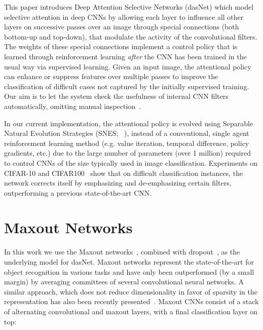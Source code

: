 This paper introduces Deep Attention Selective Networks (dasNet) which
model selective attention in deep CNNs by allowing each layer to
influence all other layers on successive passes over an image through
special connections (both bottom-up and top-down), that modulate the
activity of the convolutional filters.  The weights of these special
connections implement a control policy that is learned through
reinforcement learning {\em after} the CNN has been trained in the
usual way via supervised learning. Given an input image, the
attentional policy can enhance or suppress 
features over multiple passes to improve the classification of
difficult cases not captured by the initially supervised training.
Our aim is to let the system check the usefulness of internal CNN filters 
automatically, omitting manual inspection~\cite{zeiler2013}.

In our current implementation, the attentional policy is evolved using
Separable Natural Evolution Strategies (SNES; ~\cite{schaul2011high}),
instead of a conventional, single agent reinforcement learning method
(e.g. value iteration, temporal difference, policy gradients, etc.)
due to the large number of parameters (over 1 million)
required to control CNNs of the size typically used in image
classification.  Experiments on
CIFAR-10 and CIFAR100~\cite{krizhevsky:2009} %
show that on difficult classification instances, the network corrects
itself by emphasizing and de-emphasizing certain filters,
outperforming a previous state-of-the-art CNN.

\section{Maxout Networks}
\label{sec:maxout}
In this work we use the Maxout networks~\cite{goodfellow2013maxout},
combined with dropout~\cite{hinton2012improving}, as the underlying
model for dasNet. Maxout networks represent the state-of-the-art for
object recognition in various tasks and have only been outperformed
(by a small margin) by averaging committees of several convolutional
neural networks.  A similar approach, which does not reduce
dimensionality in favor of sparsity in the representation has also
been recently presented~\cite{srivastava:2013}.  Maxout CNNs consist
of a stack of alternating convolutional and maxout layers, with a
final classification layer on top:

